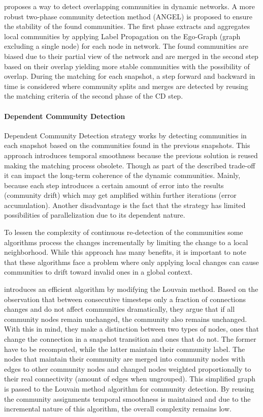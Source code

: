 \documentclass[
acmsmall,
nonacm,
screen,
acmthm]{acmart}
\begin{document}
\citet{rossettiANGELEfficientEffective2020} proposes a way to detect
overlapping communities in dynamic networks. A more robust two-phase
community detection method (ANGEL) is proposed to ensure the stability
of the found communities. The first phase extracts and aggregates local
communities by applying Label Propagation on the Ego-Graph (graph
excluding a single node) for each node in network. The found communities
are biased due to their partial view of the network and are merged in
the second step based on their overlap yielding more stable communities
with the possibility of overlap. During the matching for each snapshot,
a step forward and backward in time is considered where community splits
and merges are detected by reusing the matching criteria of the second
phase of the CD step.

\hypertarget{dependent-community-detection}{%
\paragraph{Dependent Community
Detection}\label{dependent-community-detection}}

Dependent Community Detection strategy works by detecting communities in
each snapshot based on the communities found in the previous snapshots.
This approach introduces temporal smoothness because the previous
solution is reused making the matching process obsolete. Though as part
of the described trade-off it can impact the long-term coherence of the
dynamic communities. Mainly, because each step introduces a certain
amount of error into the results (community drift) which may get
amplified within further iterations (error accumulation). Another
disadvantage is the fact that the strategy has limited possibilities of
parallelization due to its dependent nature.

To lessen the complexity of continuous re-detection of the communities
some algorithms process the changes incrementally by limiting the change
to a local neighborhood. While this approach has many benefits, it is
important to note that these algorithms face a problem where only
applying local changes can cause communities to drift toward invalid
ones in a global context.

\citet{heFastAlgorithmCommunity2015} introduces an efficient algorithm
by modifying the Louvain method. Based on the observation that between
consecutive timesteps only a fraction of connections changes and do not
affect communities dramatically, they argue that if all community nodes
remain unchanged, the community also remains unchanged. With this in
mind, they make a distinction between two types of nodes, ones that
change the connection in a snapshot transition and ones that do not. The
former have to be recomputed, while the latter maintain their community
label. The nodes that maintain their community are merged into community
nodes with edges to other community nodes and changed nodes weighted
proportionally to their real connectivity (amount of edges when
ungrouped). This simplified graph is passed to the Louvain method
algorithm for community detection. By reusing the community assignments
temporal smoothness is maintained and due to the incremental nature of
this algorithm, the overall complexity remains low.
\end{document}
